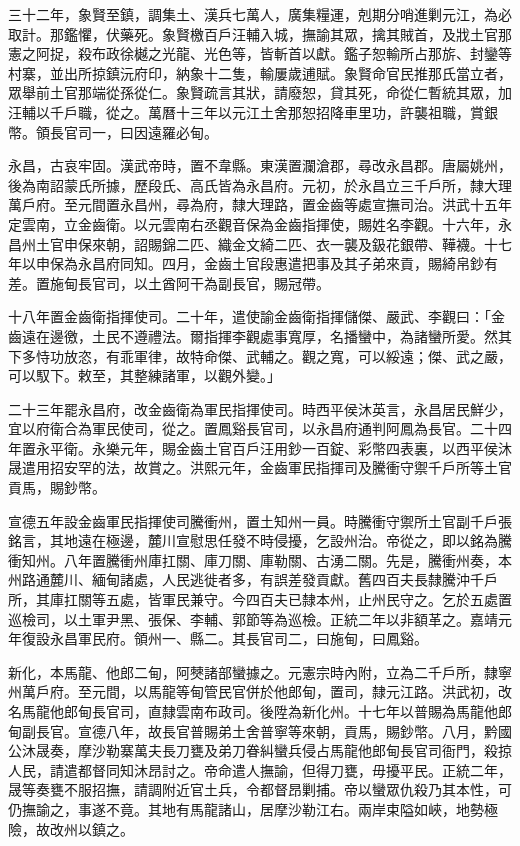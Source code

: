 \begin{pinyinscope}
三十二年，象賢至鎮，調集土、漢兵七萬人，廣集糧運，剋期分哨進剿元江，為必取計。那鑑懼，伏藥死。象賢檄百戶汪輔入城，撫諭其眾，擒其賊首，及戕土官那憲之阿捉，殺布政徐樾之光龍、光色等，皆斬首以獻。鑑子恕輸所占那旂、封鑾等村寨，並出所掠鎮沅府印，納象十二隻，輸屢歲逋賦。象賢命官民推那氏當立者，眾舉前土官那端從孫從仁。象賢疏言其狀，請廢恕，貸其死，命從仁暫統其眾，加汪輔以千戶職，從之。萬曆十三年以元江土舍那恕招降車里功，許襲祖職，賞銀幣。領長官司一，曰因遠羅必甸。

永昌，古哀牢固。漢武帝時，置不韋縣。東漢置瀾滄郡，尋改永昌郡。唐屬姚州，後為南詔蒙氏所據，歷段氏、高氏皆為永昌府。元初，於永昌立三千戶所，隸大理萬戶府。至元間置永昌州，尋為府，隸大理路，置金齒等處宣撫司治。洪武十五年定雲南，立金齒衛。以元雲南右丞觀音保為金齒指揮使，賜姓名李觀。十六年，永昌州土官申保來朝，詔賜錦二匹、織金文綺二匹、衣一襲及鈒花銀帶、鞾襪。十七年以申保為永昌府同知。四月，金齒土官段惠遣把事及其子弟來貢，賜綺帛鈔有差。置施甸長官司，以土酋阿干為副長官，賜冠帶。

十八年置金齒衛指揮使司。二十年，遣使諭金齒衛指揮儲傑、嚴武、李觀曰：「金齒遠在邊徼，土民不遵禮法。爾指揮李觀處事寬厚，名播蠻中，為諸蠻所愛。然其下多恃功放恣，有乖軍律，故特命傑、武輔之。觀之寬，可以綏遠；傑、武之嚴，可以馭下。敕至，其整練諸軍，以觀外變。」

二十三年罷永昌府，改金齒衛為軍民指揮使司。時西平侯沐英言，永昌居民鮮少，宜以府衛合為軍民使司，從之。置鳳谿長官司，以永昌府通判阿鳳為長官。二十四年置永平衛。永樂元年，賜金齒土官百戶汪用鈔一百錠、彩幣四表裏，以西平侯沐晟遣用招安罕的法，故賞之。洪熙元年，金齒軍民指揮司及騰衝守禦千戶所等土官貢馬，賜鈔幣。

宣德五年設金齒軍民指揮使司騰衝州，置土知州一員。時騰衝守禦所土官副千戶張銘言，其地遠在極邊，麓川宣慰思任發不時侵擾，乞設州治。帝從之，即以銘為騰衝知州。八年置騰衝州庫扛關、庫刀關、庫勒關、古湧二關。先是，騰衝州奏，本州路通麓川、緬甸諸處，人民逃徙者多，有誤差發貢獻。舊四百夫長隸騰沖千戶所，其庫扛關等五處，皆軍民兼守。今四百夫已隸本州，止州民守之。乞於五處置巡檢司，以土軍尹黑、張保、李輔、郭節等為巡檢。正統二年以非額革之。嘉靖元年復設永昌軍民府。領州一、縣二。其長官司二，曰施甸，曰鳳谿。

新化，本馬龍、他郎二甸，阿僰諸部蠻據之。元憲宗時內附，立為二千戶所，隸寧州萬戶府。至元間，以馬龍等甸管民官併於他郎甸，置司，隸元江路。洪武初，改名馬龍他郎甸長官司，直隸雲南布政司。後陞為新化州。十七年以普賜為馬龍他郎甸副長官。宣德八年，故長官普賜弟土舍普寧等來朝，貢馬，賜鈔幣。八月，黔國公沐晟奏，摩沙勒寨萬夫長刀甕及弟刀眷糾蠻兵侵占馬龍他郎甸長官司衙門，殺掠人民，請遣都督同知沐昂討之。帝命遣人撫諭，但得刀甕，毋擾平民。正統二年，晟等奏甕不服招撫，請調附近官土兵，令都督昂剿捕。帝以蠻眾仇殺乃其本性，可仍撫諭之，事遂不竟。其地有馬龍諸山，居摩沙勒江右。兩岸束隘如峽，地勢極險，故改州以鎮之。


\end{pinyinscope}
